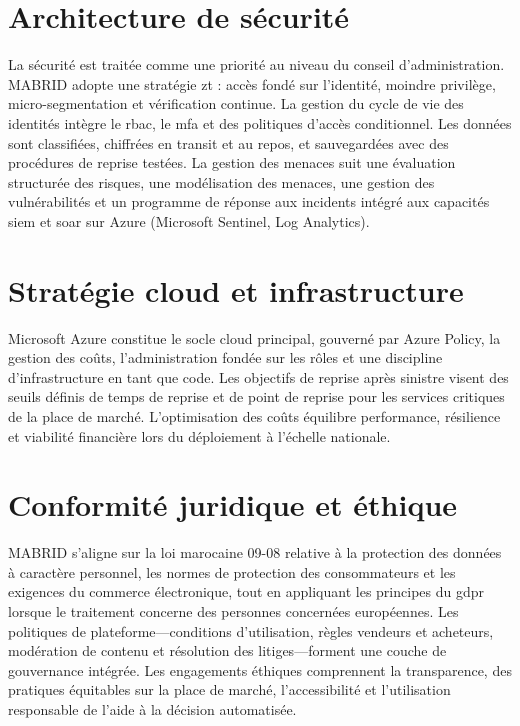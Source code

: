 \section*{Architecture de sécurité}

La sécurité est traitée comme une priorité au niveau du conseil d'administration. MABRID adopte une stratégie \gls{zt} : accès fondé sur l'identité, moindre privilège, micro-segmentation et vérification continue. La gestion du cycle de vie des identités intègre le \gls{rbac}, le \gls{mfa} et des politiques d'accès conditionnel. Les données sont classifiées, chiffrées en transit et au repos, et sauvegardées avec des procédures de reprise testées. La gestion des menaces suit une évaluation structurée des risques, une modélisation des menaces, une gestion des vulnérabilités et un programme de réponse aux incidents intégré aux capacités \gls{siem} et \gls{soar} sur Azure (Microsoft Sentinel, Log Analytics).

\section*{Stratégie cloud et infrastructure}

Microsoft Azure constitue le socle cloud principal, gouverné par Azure Policy, la gestion des coûts, l'administration fondée sur les rôles et une discipline d'infrastructure en tant que code. Les objectifs de reprise après sinistre visent des seuils définis de temps de reprise et de point de reprise pour les services critiques de la place de marché. L'optimisation des coûts équilibre performance, résilience et viabilité financière lors du déploiement à l'échelle nationale.

\section*{Conformité juridique et éthique}

MABRID s'aligne sur la loi marocaine 09-08 relative à la protection des données à caractère personnel, les normes de protection des consommateurs et les exigences du commerce électronique, tout en appliquant les principes du \gls{gdpr} lorsque le traitement concerne des personnes concernées européennes. Les politiques de plateforme---conditions d'utilisation, règles vendeurs et acheteurs, modération de contenu et résolution des litiges---forment une couche de gouvernance intégrée. Les engagements éthiques comprennent la transparence, des pratiques équitables sur la place de marché, l'accessibilité et l'utilisation responsable de l'aide à la décision automatisée.

